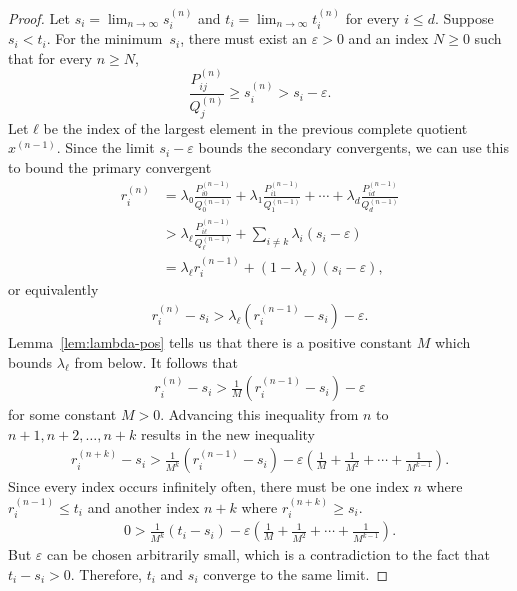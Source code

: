 \begin{proof}
  Let $s_i = \lim_{n → ∞} s_i^{(n)}$
  and $t_i = \lim_{n → ∞} t_i^{(n)}$ for every $i ≤ d$.
  Suppose $s_i < t_i$.
  For the minimum~$s_i$, there must exist an $ε > 0$ and an index $N ≥ 0$ such
  that for every $n ≥ N$,
  \[
    \frac{P_{ij}^{(n)}}{Q_j^{(n)}} ≥ s_i^{(n)} > s_i - ε.
  \]
  Let $ℓ$ be the index of the largest element in the previous complete quotient $x^{(n-1)}$.
  Since the limit $s_i - ε$ bounds the secondary convergents,
  we can use this to bound the primary convergent
  \begin{align*}
    r_i^{(n)}
    & = λ₀ \frac{P_{i0}^{(n-1)}}{Q_0^{(n-1)}} + λ₁ \frac{P_{i1}^{(n-1)}}{Q_1^{(n-1)}} + ⋯ + λ_d \frac{P_{id}^{(n-1)}}{Q_d^{(n-1)}} \\
    & > \lambda_{ℓ} \frac{P_{iℓ}^{(n-1)}}{Q_{ℓ}^{(n-1)}} + \sum_{i ≠ k} λ_i (s_i - ε) \\
    & = \lambda_{ℓ} r_i^{(n-1)} + (1 - λ_ℓ) (s_i - ε),
  \end{align*}
  or equivalently
  \begin{align*}
    r_i^{(n)} - s_i > λ_{ℓ} \left( r_i^{(n-1)} - s_i \right) - ε.
  \end{align*}
  Lemma~\ref{lem:lambda-pos} tells us that there is a positive constant $M$
  which bounds $λ_{ℓ}$ from below.
  It follows that
  \begin{align*}
    r_i^{(n)} - s_i > \frac{1}{M} \left( r_i^{(n-1)} - s_i \right) - ε
  \end{align*}
  for some constant $M > 0$.
  Advancing this inequality from $n$ to $n+1, n+2, …, n+k$ results in the new
  inequality
  \begin{align*}
    r_i^{(n+k)} - s_i > \frac{1}{M^k} \left( r_i^{(n-1)} - s_i \right) - ε\left( \frac{1}{M} + \frac{1}{M^2} + ⋯ + \frac{1}{M^{k-1}} \right).
  \end{align*}
  Since every index occurs infinitely often,
  there must be one index $n$ where $r_i^{(n-1)} ≤ t_i$
  and another index $n+k$ where $r_i^{(n+k)} ≥ s_i$.
  \begin{align*}
    0 > \frac{1}{M^k} \left( t_i - s_i \right) - ε\left( \frac{1}{M} + \frac{1}{M^2} + ⋯ + \frac{1}{M^{k-1}} \right).
  \end{align*}
  But $ε$ can be chosen arbitrarily small,
  which is a contradiction to the fact that $t_i - s_i > 0$.
  Therefore, $t_i$ and $s_i$ converge to the same limit.
\end{proof}

